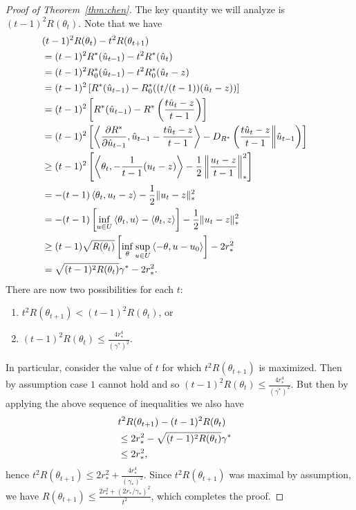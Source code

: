 \documentclass[paper.tex]{subfiles}
\begin{document}
\begin{proof}[Proof of Theorem~\ref{thm:chen}]
The key quantity we will analyze is $(t-1)^2R(\theta_t)$. Note that we have
\begin{align*}
\lefteqn{(t-1)^2R(\theta_t) - t^2R(\theta_{t+1})} \\
 &= (t-1)^2R^*(\hat{u}_{t-1})-t^2R^*(\hat{u}_t) \\
 &= (t-1)^2R_0^*(\hat{u}_{t-1})-t^2R_0^*(\hat{u}_t-z) \\
 &= (t-1)^2\left[R^*(\hat{u}_{t-1})-R_0^*((t/(t-1))(\hat{u}_t-z))\right] \\
 &= (t-1)^2\left[R^*(\hat{u}_{t-1})-R^*\left(\frac{t\hat{u}_t-z}{t-1}\right)\right] \\
 &= (t-1)^2\left[\ip{\frac{\partial R^*}{\partial \hat{u}_{t-1}}}{\hat{u}_{t-1}-\frac{t\hat{u}_t-z}{t-1}}-D_{R^*}\left(\frac{t\hat{u}_t-z}{t-1} \middle\| \hat{u}_{t-1}\right)\right] \\
 &\geq (t-1)^2\left[\ip{\theta_t}{-\frac{1}{t-1}(u_t-z)}-\frac{1}{2}\left\|\frac{u_t-z}{t-1}\right\|_*^2\right] \\
 &= -(t-1)\ip{\theta_t}{u_t-z}-\frac{1}{2}\|u_t-z\|_*^2 \\
 &= -(t-1)\left[\inf_{u \in U} \ip{\theta_t}{u} - \ip{\theta_t}{z}\right]-\frac{1}{2}\|u_t-z\|_*^2 \\
 &\geq (t-1)\sqrt{R(\theta_t)}\left[\inf_{\theta} \sup_{u \in U} \ip{-\theta}{u-u_0}\right]-2r_*^2 \\
 &= \sqrt{(t-1)^2R(\theta_t)}\gamma^*-2r_*^2.
\end{align*}
There are now two possibilities for each $t$:
\begin{enumerate}
\item $t^2R(\theta_{t+1}) < (t-1)^2R(\theta_t)$, or
\item $(t-1)^2R(\theta_t) \leq \frac{4r_*^4}{(\gamma^*)^2}$.
\end{enumerate}
In particular, consider the value of $t$ for which 
$t^2R(\theta_{t+1})$ is maximized. Then by assumption 
case $1$ cannot hold and so $(t-1)^2R(\theta_t) \leq \frac{4r_*^4}{(\gamma^*)^2}$.
But then by applying the above sequence of inequalities 
we also have 
\begin{align*}
\lefteqn{t^2R(\theta_{t+1}) - (t-1)^2R(\theta_t)} \\
 &\leq 2r_*^2 - \sqrt{(t-1)^2R(\theta_t)}\gamma^* \\
 &\leq 2r_*^2,
\end{align*}
hence $t^2R(\theta_{t+1}) \leq 2r_*^2 + \frac{4r_*^4}{(\gamma_*)^2}$. 
Since $t^2R(\theta_{t+1})$ was maximal by assumption, we have
$R(\theta_{t+1}) \leq \frac{2r_*^2+(2r_*/\gamma_*)^2}{t^2}$, which 
completes the proof.
\end{proof}
\end{document}
